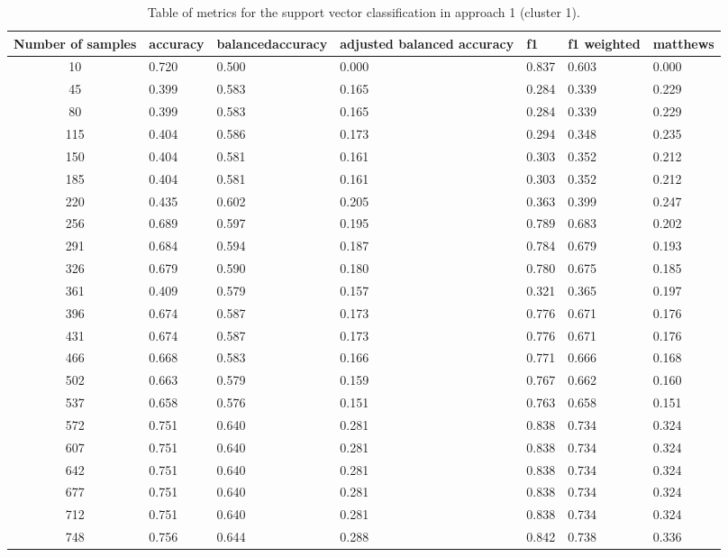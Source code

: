 \documentclass[sigplan,screen]{acmart}
\begin{document}
\begin{table}[h]
  \caption{Table of metrics for the support vector classification in approach 1 (cluster 1).}
  \label{tab:A1_classification_svc_cluster1}
  \begin{tabular}{cllllll}
    \toprule
    Number of samples & accuracy & balancedaccuracy & adjusted balanced accuracy & f1 & f1 weighted & matthews\\
    \midrule
       10 & 0.720 & 0.500 & 0.000 & 0.837 & 0.603 & 0.000\\
       45 & 0.399 & 0.583 & 0.165 & 0.284 & 0.339 & 0.229\\
       80 & 0.399 & 0.583 & 0.165 & 0.284 & 0.339 & 0.229\\
      115 & 0.404 & 0.586 & 0.173 & 0.294 & 0.348 & 0.235\\
      150 & 0.404 & 0.581 & 0.161 & 0.303 & 0.352 & 0.212\\
      185 & 0.404 & 0.581 & 0.161 & 0.303 & 0.352 & 0.212\\
      220 & 0.435 & 0.602 & 0.205 & 0.363 & 0.399 & 0.247\\
      256 & 0.689 & 0.597 & 0.195 & 0.789 & 0.683 & 0.202\\
      291 & 0.684 & 0.594 & 0.187 & 0.784 & 0.679 & 0.193\\
      326 & 0.679 & 0.590 & 0.180 & 0.780 & 0.675 & 0.185\\
      361 & 0.409 & 0.579 & 0.157 & 0.321 & 0.365 & 0.197\\
      396 & 0.674 & 0.587 & 0.173 & 0.776 & 0.671 & 0.176\\
      431 & 0.674 & 0.587 & 0.173 & 0.776 & 0.671 & 0.176\\
      466 & 0.668 & 0.583 & 0.166 & 0.771 & 0.666 & 0.168\\
      502 & 0.663 & 0.579 & 0.159 & 0.767 & 0.662 & 0.160\\
      537 & 0.658 & 0.576 & 0.151 & 0.763 & 0.658 & 0.151\\
      572 & 0.751 & 0.640 & 0.281 & 0.838 & 0.734 & 0.324\\
      607 & 0.751 & 0.640 & 0.281 & 0.838 & 0.734 & 0.324\\
      642 & 0.751 & 0.640 & 0.281 & 0.838 & 0.734 & 0.324\\
      677 & 0.751 & 0.640 & 0.281 & 0.838 & 0.734 & 0.324\\
      712 & 0.751 & 0.640 & 0.281 & 0.838 & 0.734 & 0.324\\
      748 & 0.756 & 0.644 & 0.288 & 0.842 & 0.738 & 0.336\\

\end{tabular}
\end{table}
\end{document}
